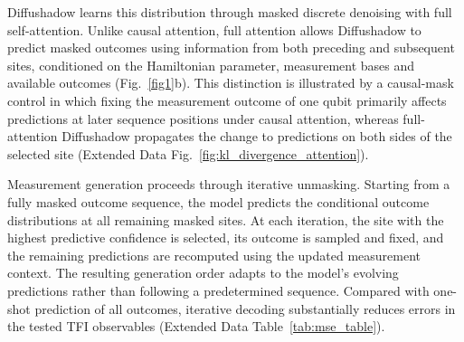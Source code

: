 \documentclass[pdflatex,sn-nature]{sn-jnl}%
\theoremstyle{thmstyleone}%
\theoremstyle{thmstyletwo}%
\theoremstyle{thmstylethree}%
\begin{document}










Diffushadow learns this distribution through masked discrete denoising with full self-attention. Unlike causal attention, full attention allows Diffushadow to predict masked outcomes using information from both preceding and subsequent sites, conditioned on the Hamiltonian parameter, measurement bases and available outcomes (Fig.~\ref{fig1}b). This distinction is illustrated by a causal-mask control in which fixing the measurement outcome of one qubit primarily affects predictions at later sequence positions under causal attention, whereas full-attention Diffushadow propagates the change to predictions on both sides of the selected site (Extended Data Fig.~\ref{fig:kl_divergence_attention}).


Measurement generation proceeds through iterative unmasking. Starting from a fully masked outcome sequence, the model predicts the conditional outcome distributions at all remaining masked sites. At each iteration, the site with the highest predictive confidence is selected, its outcome is sampled and fixed, and the remaining predictions are recomputed using the updated measurement context. The resulting generation order adapts to the model's evolving predictions rather than following a predetermined sequence. Compared with one-shot prediction of all outcomes, iterative decoding substantially reduces errors in the tested TFI observables (Extended Data Table~\ref{tab:mse_table}).
\end{document}
